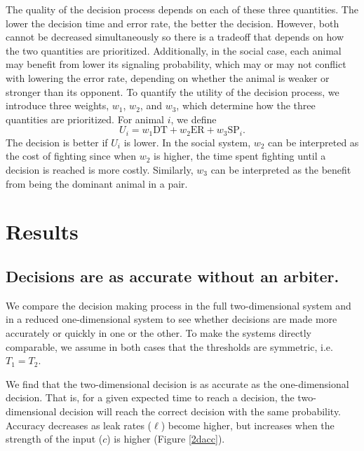 \documentclass{article}
\begin{document}
The quality of the decision process depends on each of these three quantities.  The lower the decision time and error rate, the better the decision.  However, both cannot be decreased simultaneously so there is a tradeoff that depends on how the two quantities are prioritized.  Additionally, in the social case, each animal may benefit from lower its signaling probability, which may or may not conflict with lowering the error rate, depending on whether the animal is weaker or stronger than its opponent.  To quantify the utility of the decision process, we introduce three weights, $w_1$, $w_2$, and $w_3$, which determine how the three quantities are prioritized.  For animal $i$, we define
\begin{equation*}
U_i=w_1\text{DT}+w_2\text{ER}+w_3\text{SP}_i.
\end{equation*}
The decision is better if $U_i$ is lower.  In the social system, $w_2$ can be interpreted as the cost of fighting since when $w_2$ is higher, the time spent fighting until a decision is reached is more costly.  Similarly, $w_3$ can be interpreted as the benefit from being the dominant animal in a pair.




\section{Results}

\subsection{Decisions are as accurate without an arbiter. }
We compare the decision making process in the full two-dimensional system and in a reduced one-dimensional system to see whether decisions are made more accurately or quickly in one or the other.  To make the systems directly comparable, we assume in both cases that the thresholds are symmetric, i.e. $T_1=T_2$. 

We find that the two-dimensional decision is as accurate as the one-dimensional decision.  That is, for a given expected time to reach a decision, the two-dimensional decision will reach the correct decision with the same probability.  Accuracy decreases as leak rates ($\ell$) become higher, but increases when the strength of the input ($c$) is higher (Figure \ref{2dacc}).
\end{document}
